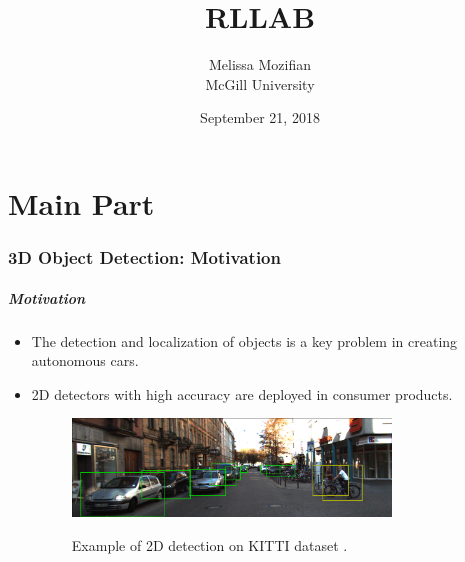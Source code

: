 \documentclass[10pt,fleqn,unknownkeysallowed]{beamer}
\author[M. Mozifian]{Melissa Mozifian\\[5pt]\scriptsize{McGill University}}
\title{RLLAB}
\institute{\small{Real-time 3D Object Detection for Autonomous Driving }}
\date[21/9/2018]{September 21, 2018}
\begin{document}
\frame[plain]{\titlepage}

\part{Main Part}
	
\section{3D Object Detection: Motivation}
\begin{frame}
	\frametitle{Motivation}
	  \begin{itemize}
	  	\item{The detection and localization of objects is a key problem in creating autonomous cars.}
	  	\item{2D detectors with high accuracy are deployed in consumer products.}
  		\begin{figure}
  			\begin{center}
  				\includegraphics[width=0.8\textwidth]{images/detection_2d}\\
  				\caption{Example of 2D detection on KITTI dataset \cite{kitti}.}
  			\end{center}
  		\end{figure}
	  \end{itemize}
\end{frame}
\end{document}

